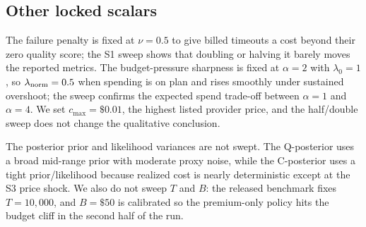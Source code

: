\subsection{Other locked scalars}
\label{app:sens-other}

The failure penalty is fixed at $\nu=0.5$ to give billed timeouts a cost beyond
their zero quality score; the S1 sweep shows that doubling or halving it barely
moves the reported metrics. The budget-pressure sharpness is fixed at
$\alpha=2$ with $\lambda_0=1$, so $\lambda_{\mathrm{norm}}=0.5$ when spending is on plan and rises
smoothly under sustained overshoot; the sweep confirms the expected spend
trade-off between $\alpha=1$ and $\alpha=4$. We set
$c_{\max}=\$0.01$, the highest listed provider price, and the half/double sweep
does not change the qualitative conclusion.

The posterior prior and likelihood variances are not swept. The Q-posterior
uses a broad mid-range prior with moderate proxy noise, while the C-posterior
uses a tight prior/likelihood because realized cost is nearly deterministic
except at the S3 price shock. We also do not sweep $T$ and $B$: the released
benchmark fixes $T=10{,}000$, and $B=\$50$ is calibrated so the premium-only
policy hits the budget cliff in the second half of the run.
